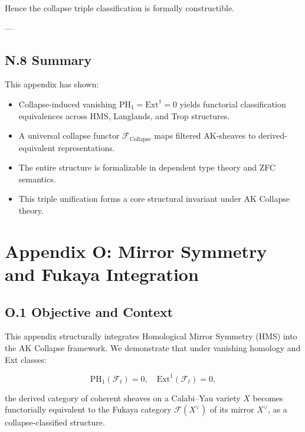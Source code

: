 \documentclass[11pt]{article}
\begin{document}
Hence the collapse triple classification is formally constructible.

---

\subsection*{N.8 Summary}

This appendix has shown:
\begin{itemize}
  \item Collapse-induced vanishing $\mathrm{PH}_1 = \mathrm{Ext}^1 = 0$ yields functorial classification equivalences across HMS, Langlands, and Trop structures.
  \item A universal collapse functor $\mathcal{F}_{\mathrm{Collapse}}$ maps filtered AK-sheaves to derived-equivalent representations.
  \item The entire structure is formalizable in dependent type theory and ZFC semantics.
  \item This triple unification forms a core structural invariant under AK Collapse theory.
\end{itemize}




\section*{Appendix O: Mirror Symmetry and Fukaya Integration}

\subsection*{O.1 Objective and Context}

This appendix structurally integrates Homological Mirror Symmetry (HMS) into the AK Collapse framework. We demonstrate that under vanishing homology and Ext classes:

\[
\mathrm{PH}_1(\mathcal{F}_t) = 0, \quad \mathrm{Ext}^1(\mathcal{F}_t) = 0,
\]

the derived category of coherent sheaves on a Calabi–Yau variety $X$ becomes functorially equivalent to the Fukaya category $\mathcal{F}(X^\vee)$ of its mirror $X^\vee$, as a collapse-classified structure.
\end{document}

